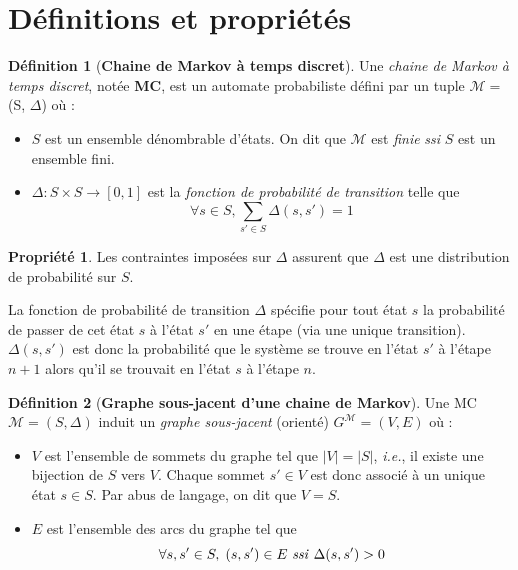 \documentclass[12pt,a4paper]{report}
\theoremstyle{definition}%
\newtheorem{definition}{Définition}[chapter]
\newtheorem{propriete}{Propriété}[chapter]
\theoremstyle{remark}
\newcommand{\ssi}{\textit{ssi} }
\newcommand{\ie}{\textit{i.e.}, }
\let\labelitemi\labelitemii
\begin{document}
\section{Définitions et propriétés}
\theoremstyle{definition}
\begin{definition}[\textbf{Chaine de Markov à temps discret}]
	
	Une \textit{chaine de Markov à temps discret}, notée \textbf{MC}, est un automate probabiliste défini par un tuple  $\mathcal{M} =$ (S, $\Delta$) où :
	\begin{itemize}
		\renewcommand{\labelitemi}{\tiny$\bullet$}
		\item $S$ est un ensemble dénombrable d'états. On dit que $\mathcal{M}$ est \textit{finie} \ssi $S$ est un ensemble fini.
		\item $\Delta: S \times S \rightarrow [0,1]$ est la \textit{fonction de probabilité de transition} telle que \[\forall s \in S, \sum_{s' \in S}\Delta(s, s')= 1\]
	\end{itemize}
\end{definition}

\begin{propriete}
	Les contraintes imposées sur $\Delta$ assurent que $\Delta$ est une distribution de probabilité sur $S$.
\end{propriete}
La fonction de probabilité de transition $\Delta$ spécifie pour tout état $s$ la probabilité de passer de cet état $s$ à l'état $s'$ en une étape (via une unique transition). 
$\Delta(s, s')$ est donc la probabilité que le système se trouve en l'état $s'$ à l'étape $n+1$ alors qu'il se trouvait en l'état $s$ à l'étape $n$. \\

\begin{definition}[\textbf{Graphe sous-jacent d'une chaine de Markov}]
	Une MC $\mathcal{M} = (S, \Delta)$ induit un \textit{graphe sous-jacent} (orienté) $G^\mathcal{M} = (V, E)$ où :
	\begin{itemize}
		\renewcommand{\labelitemi}{\tiny$\bullet$}
		\item $V$ est l'ensemble de sommets du graphe tel que $|V| = |S|$, \ie il existe une bijection de $S$ vers $V$. Chaque sommet $s' \in V$ est donc associé à un unique état $s \in S$. Par abus de langage, on dit que $V = S$.
		\item $E$ est l'ensemble des arcs du graphe tel que \[ \forall s, s' \in S, \; (s, s') \in E \text{ \ssi} \Delta(s, s') > 0\]
	\end{itemize}
\end{definition}
\end{document}
